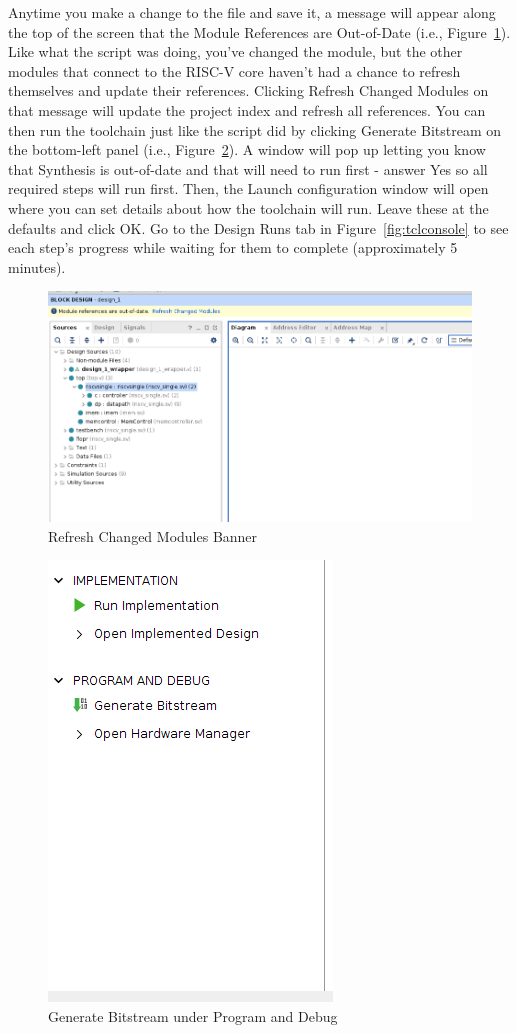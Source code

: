 \documentclass{article}
\begin{document}
\begin{enumerate}
Anytime you make a change to the file and save it, a message will appear along
the top of the screen that the Module References are Out-of-Date
(i.e., Figure~\ref{fig:refreshmodules}).  Like what the
script was doing, you've changed the module, but the other modules that connect
to the RISC-V core haven't had a chance to refresh themselves and update their
references.  Clicking Refresh Changed Modules on that message will update the
project index and refresh all references.  You can then run the toolchain just
like the script did by clicking Generate Bitstream on the bottom-left
panel (i.e., Figure~\ref{fig:generatebitstream}).  A
window will pop up letting you know that Synthesis is out-of-date and that will
need to run first - answer Yes so all required steps will run first.  Then, the
Launch configuration window will open where you can set details about how the
toolchain will run.  Leave these at the defaults and click OK.  Go
to the Design Runs tab in Figure~\ref{fig:tclconsole} to see each step's
progress while waiting for them to complete (approximately 5 minutes).
\begin{figure}[h!]
	\centering
	\includegraphics[width=0.9\linewidth]{refresh_modules2}
	\caption{Refresh Changed Modules Banner}
	\label{fig:refreshmodules}
\end{figure}
\begin{figure}[h!]
	\centering
	\includegraphics[width=0.3\linewidth]{generate_bitstream}
	\caption{Generate Bitstream under Program and Debug}
	\label{fig:generatebitstream}
\end{figure}


\end{enumerate}
\end{document}
